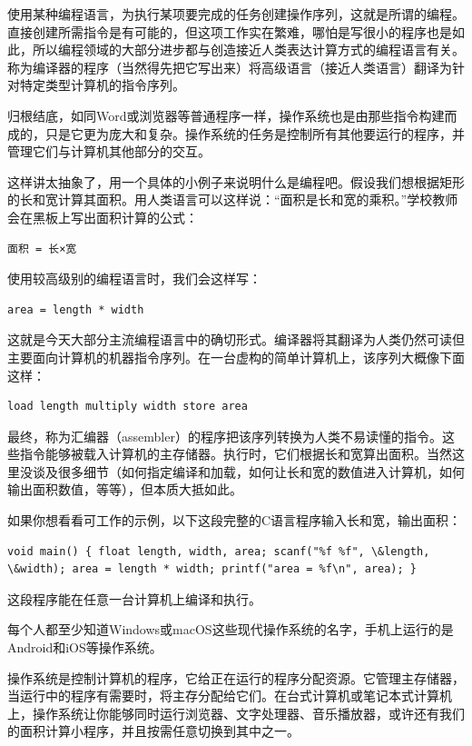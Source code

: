 \documentclass[a4paper,12pt,UTF8,twoside]{ctexbook}
\begin{document}
使用某种编程语言，为执行某项要完成的任务创建操作序列，这就是所谓的编程。直接创建所需指令是有可能的，但这项工作实在繁难，哪怕是写很小的程序也是如此，所以编程领域的大部分进步都与创造接近人类表达计算方式的编程语言有关。称为编译器的程序（当然得先把它写出来）将高级语言（接近人类语言）翻译为针对特定类型计算机的指令序列。

归根结底，如同Word或浏览器等普通程序一样，操作系统也是由那些指令构建而成的，只是它更为庞大和复杂。操作系统的任务是控制所有其他要运行的程序，并管理它们与计算机其他部分的交互。

这样讲太抽象了，用一个具体的小例子来说明什么是编程吧。假设我们想根据矩形的长和宽计算其面积。用人类语言可以这样说：“面积是长和宽的乘积。”学校教师会在黑板上写出面积计算的公式：

\begin{lstlisting}
面积 = 长×宽
\end{lstlisting}

使用较高级别的编程语言时，我们会这样写：

\begin{lstlisting}
area = length * width
\end{lstlisting}

这就是今天大部分主流编程语言中的确切形式。编译器将其翻译为人类仍然可读但主要面向计算机的机器指令序列。在一台虚构的简单计算机上，该序列大概像下面这样：

\begin{lstlisting}
load length multiply width store area
\end{lstlisting}

最终，称为汇编器（assembler）的程序把该序列转换为人类不易读懂的指令。这些指令能够被载入计算机的主存储器。执行时，它们根据长和宽算出面积。当然这里没谈及很多细节（如何指定编译和加载，如何让长和宽的数值进入计算机，如何输出面积数值，等等），但本质大抵如此。

如果你想看看可工作的示例，以下这段完整的C语言程序输入长和宽，输出面积：

\begin{lstlisting}
void main() { float length, width, area; scanf("%f %f", \&length, \&width); area = length * width; printf("area = %f\n", area); }
\end{lstlisting}

这段程序能在任意一台计算机上编译和执行。

每个人都至少知道Windows或macOS这些现代操作系统的名字，手机上运行的是Android和iOS等操作系统。

操作系统是控制计算机的程序，它给正在运行的程序分配资源。它管理主存储器，当运行中的程序有需要时，将主存分配给它们。在台式计算机或笔记本式计算机上，操作系统让你能够同时运行浏览器、文字处理器、音乐播放器，或许还有我们的面积计算小程序，并且按需任意切换到其中之一。
\end{document}
